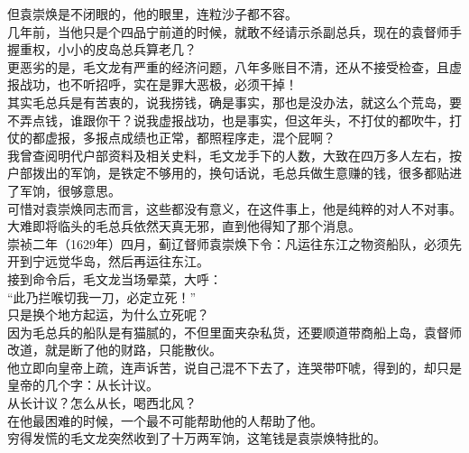 \begin{multicols}{\theparacolNo}
但袁崇焕是不闭眼的，他的眼里，连粒沙子都不容。\\

几年前，当他只是个四品宁前道的时候，就敢不经请示杀副总兵，现在的袁督师手握重权，小小的皮岛总兵算老几？\\

更恶劣的是，毛文龙有严重的经济问题，八年多账目不清，还从不接受检查，且虚报战功，也不听招呼，实在是罪大恶极，必须干掉！\\

其实毛总兵是有苦衷的，说我捞钱，确是事实，那也是没办法，就这么个荒岛，要不弄点钱，谁跟你干？说我虚报战功，也是事实，但这年头，不打仗的都吹牛，打仗的都虚报，多报点成绩也正常，都照程序走，混个屁啊？\\

我曾查阅明代户部资料及相关史料，毛文龙手下的人数，大致在四万多人左右，按户部拨出的军饷，是铁定不够用的，换句话说，毛总兵做生意赚的钱，很多都贴进了军饷，很够意思。\\

可惜对袁崇焕同志而言，这些都没有意义，在这件事上，他是纯粹的对人不对事。\\

大难即将临头的毛总兵依然天真无邪，直到他得知了那个消息。\\

崇祯二年（1629年）四月，蓟辽督师袁崇焕下令：凡运往东江之物资船队，必须先开到宁远觉华岛，然后再运往东江。\\

接到命令后，毛文龙当场晕菜，大呼：\\

“此乃拦喉切我一刀，必定立死！”\\

只是换个地方起运，为什么立死呢？\\

因为毛总兵的船队是有猫腻的，不但里面夹杂私货，还要顺道带商船上岛，袁督师改道，就是断了他的财路，只能散伙。\\

他立即向皇帝上疏，连声诉苦，说自己混不下去了，连哭带吓唬，得到的，却只是皇帝的几个字：从长计议。\\

从长计议？怎么从长，喝西北风？\\

在他最困难的时候，一个最不可能帮助他的人帮助了他。\\

穷得发慌的毛文龙突然收到了十万两军饷，这笔钱是袁崇焕特批的。\\


\end{multicols}
